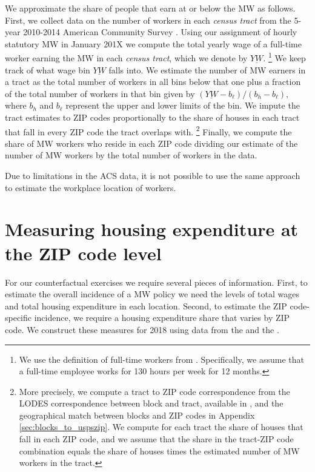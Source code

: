 We approximate the share of people that earn at or below the MW as follows.
First, we collect data on the number of workers in each \textit{census tract}
from the 5-year 2010-2014 American Community Survey \parencite[ACS;][]{CensusACS}.
Using our assignment of hourly statutory MW in January 201X we compute 
the total yearly wage of a full-time worker earning the MW in each 
\textit{census tract}, which we denote by $\underline{YW}$.%
\footnote{We use the definition of full-time workers from \textcite{IRSfulltime}.
Specifically, we assume that a full-time employee works for 130 hours per week
for 12 months.}
We keep track of what wage bin $\underline{YW}$ falls into.
We estimate the number of MW earners in a tract as the total number of workers 
in all bins below that one plus a fraction of the total number of workers in 
that bin given by 
$\left(\underline{YW} - b_\ell\right)/\left(b_h - b_\ell\right),$
where $b_h$ and $b_\ell$ represent the upper and lower limits of 
the bin.
We impute the tract estimates to ZIP codes proportionally to the share of 
houses in each tract that fall in every ZIP code the tract overlaps with.%
\footnote{More precisely, we compute a tract to ZIP code correspondence from
the LODES correspondence between block and tract, available in 
\parencite{CensusLODES}, and the geographical match between blocks and ZIP codes
in Appendix \ref{sec:blocks_to_uspszip}.
We compute for each tract the share of houses that fall in each ZIP code, and we
assume that the share in the tract-ZIP code combination equals the share of
houses times the estimated number of MW workers in the tract.}
Finally, we compute the share of MW workers who reside in each ZIP 
code dividing our estimate of the number of MW workers by the total
number of workers in the data. 

Due to limitations in the ACS data, it is not possible to use the same approach 
to estimate the workplace location of workers.

\clearpage
\section{Measuring housing expenditure at the ZIP code level}
\label{sec:measure_housing_expenditure}

For our counterfactual exercises we require several pieces of information.
First, to estimate the overall incidence of a MW policy we need the levels 
of total wages and total housing expenditure in each location.
Second, to estimate the ZIP code-specific incidence, we require a housing 
expenditure share that varies by ZIP code.
We construct these measures for 2018 using data from the \textcite{IRS} and
the \textcite{hudSAFMR}.

